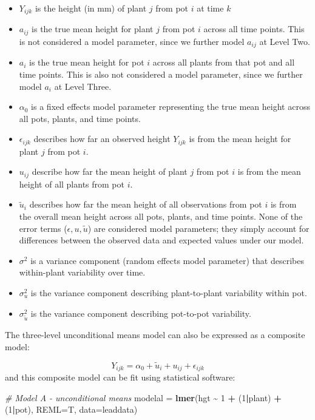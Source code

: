 \documentclass[
]{krantz}
\newenvironment{Shaded}{\begin{snugshade}}{\end{snugshade}}
\newcommand{\AttributeTok}[1]{\textcolor[rgb]{0.27,0.27,0.27}{#1}}
\newcommand{\CommentTok}[1]{\textcolor[rgb]{0.37,0.37,0.37}{\textit{#1}}}
\newcommand{\DecValTok}[1]{\textcolor[rgb]{0.06,0.06,0.06}{#1}}
\newcommand{\FunctionTok}[1]{\textcolor[rgb]{0.27,0.27,0.27}{\textbf{#1}}}
\newcommand{\NormalTok}[1]{#1}
\newcommand{\OtherTok}[1]{\textcolor[rgb]{0.37,0.37,0.37}{#1}}
\newcommand{\SpecialCharTok}[1]{\textcolor[rgb]{0.43,0.43,0.43}{\textbf{#1}}}
\providecommand{\tightlist}{%
  \setlength{\itemsep}{0pt}\setlength{\parskip}{0pt}}
\begin{document}
\begin{itemize}
\tightlist
\item
  \(Y_{ijk}\) is the height (in mm) of plant \(j\) from pot \(i\) at time \(k\)
\item
  \(a_{ij}\) is the true mean height for plant \(j\) from pot \(i\) across all time points. This is not considered a model parameter, since we further model \(a_{ij}\) at Level Two.
\item
  \(a_{i}\) is the true mean height for pot \(i\) across all plants from that pot and all time points. This is also not considered a model parameter, since we further model \(a_{i}\) at Level Three.
\item
  \(\alpha_{0}\) is a fixed effects model parameter representing the true mean height across all pots, plants, and time points.
\item
  \(\epsilon_{ijk}\) describes how far an observed height \(Y_{ijk}\) is from the mean height for plant \(j\) from pot \(i\).
\item
  \(u_{ij}\) describe how far the mean height of plant \(j\) from pot \(i\) is from the mean height of all plants from pot \(i\).
\item
  \(\tilde{u}_{i}\) describes how far the mean height of all observations from pot \(i\) is from the overall mean height across all pots, plants, and time points. None of the error terms (\(\epsilon, u, \tilde{u}\)) are considered model parameters; they simply account for differences between the observed data and expected values under our model.
\item
  \(\sigma^2\) is a variance component (random effects model parameter) that describes within-plant variability over time.
\item
  \(\sigma_{u}^{2}\) is the variance component describing plant-to-plant variability within pot.
\item
  \(\sigma_{\tilde{u}}^{2}\) is the variance component describing pot-to-pot variability.
\end{itemize}

The three-level unconditional means model can also be expressed as a composite model:

\begin{equation*}
Y_{ijk}=\alpha_{0}+\tilde{u}_{i}+u_{ij}+\epsilon_{ijk}
\end{equation*}
and this composite model can be fit using statistical software:

\begin{Shaded}
\begin{Highlighting}[]
\CommentTok{\# Model A {-} unconditional means}
\NormalTok{modelal }\OtherTok{=} \FunctionTok{lmer}\NormalTok{(hgt }\SpecialCharTok{\textasciitilde{}} \DecValTok{1} \SpecialCharTok{+}\NormalTok{ (}\DecValTok{1}\SpecialCharTok{|}\NormalTok{plant) }\SpecialCharTok{+}\NormalTok{ (}\DecValTok{1}\SpecialCharTok{|}\NormalTok{pot), }
               \AttributeTok{REML=}\NormalTok{T, }\AttributeTok{data=}\NormalTok{leaddata)}
\end{Highlighting}
\end{Shaded}
\end{document}

